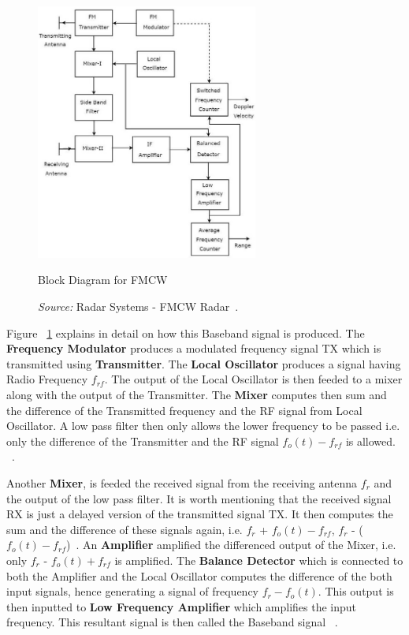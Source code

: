  \begin{figure}[ht]
  \begin{center}
    \includegraphics[width=0.650\textwidth]{Master's thesis/images/fmcw_working.jpg} 
    \caption{Block Diagram for FMCW}
    \caption*{\textit{Source:} Radar Systems - FMCW Radar~\cite{tutorialspoint}.}
    \label{fig:fmcw}
  \end{center}
\end{figure}   

Figure ~\ref{fig:fmcw} explains in detail on how this Baseband signal is produced. 
The \textbf{Frequency Modulator} produces a modulated frequency signal TX which is transmitted using \textbf{Transmitter}. The \textbf{Local Oscillator} produces a signal having Radio Frequency \(f_{rf}\). The output of the Local Oscillator is then feeded to a mixer along with the output of the Transmitter. The \textbf{Mixer} computes then sum and the difference of the Transmitted frequency and the RF signal from Local Oscillator. A low pass filter then only allows the lower frequency to be passed i.e. only the difference of the Transmitter and the RF signal \(f_o(t) - f_{rf}\) is allowed. ~\cite{tutorialspoint}. 

Another \textbf{Mixer}, is feeded the received signal from the receiving antenna \(f_r\) and the output of the low pass filter. It is worth mentioning that the received signal RX is just a delayed version of the transmitted signal TX. It then computes the sum and the difference of these signals again, i.e. \(f_r\) + \(f_o(t) - f_{rf}\), \(f_r\) - (\(f_o(t) - f_{rf}\))~\cite{tutorialspoint}. An \textbf{Amplifier} amplified the differenced output of the Mixer, i.e. only \(f_r\) - \(f_o(t) + f_{rf}\) is amplified. The \textbf{Balance Detector} which is connected to both the Amplifier and the Local Oscillator computes the difference of the both input signals, hence generating a signal of frequency \(f_r - f_o(t)\). 
This output is then inputted to \textbf{Low Frequency Amplifier} which amplifies the input frequency. This resultant signal is then called the Baseband signal ~\cite{tutorialspoint}. 


